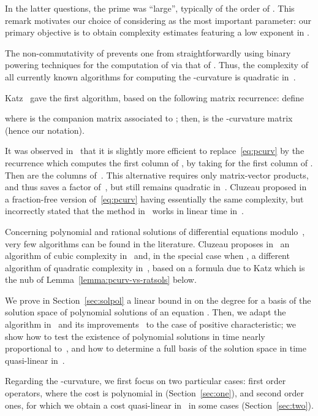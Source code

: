 \documentclass{sig-alternate}
\begin{document}
In the latter questions, the prime  was ``large'', typically of the
order of . This remark motivates our choice of considering 
as the most important parameter: our primary objective is to obtain
complexity estimates featuring a low exponent in .

\smallskip{}  The non-commutativity of
 prevents one from straightforwardly
using binary powering techniques for the computation of  via
that of . Thus, the complexity of all currently
known algorithms for computing the -curvature is quadratic in~.

Katz~\cite{Katz82} gave the first algorithm, based on the following
matrix recurrence: define

where  is the companion matrix
associated to ; then,  is the -curvature matrix (hence
our notation). 

It was observed in~\cite[\S13.2.2]{PuSi03} that it is slightly more
efficient to replace~\eqref{eq:pcurv} by the recurrence  which computes the first column  of
, by taking for  the first column of . Then
 are the columns of~. This
alternative requires only matrix-vector products, and thus saves a
factor of~, but still remains quadratic in~.  Cluzeau proposed
in~\cite[Prop.~3.2]{Cluzeau03} a fraction-free version
of~\eqref{eq:pcurv} having essentially the same complexity, but
incorrectly stated that the method in~\cite{PuSi03} works in linear
time in~.

Concerning polynomial and rational solutions of differential equations
modulo~, very few algorithms can be found in the literature. Cluzeau
proposes in~\cite[\S2]{Cluzeau03} an algorithm of cubic complexity
in~ and, in the special case when , a different algorithm
of quadratic complexity in~, based on a formula due to Katz which is
the nub of Lemma~\ref{lemma:pcurv-vs-ratsols} below.

\smallskip{}  We prove in
Section~\ref{sec:solpol} a linear bound in  on the degree for a
basis of the solution space of polynomial solutions of an equation
. Then, we adapt the algorithm in~\cite{AbBrPe95} and its
improvements~\cite{BoClSa05} to the case of positive characteristic;
we show how to test the existence of polynomial solutions in time
nearly proportional to~, and how to determine a full basis of the solution
space in time quasi-linear in~.

Regarding the -curvature, we first focus on two particular cases:
first order operators, where the cost is polynomial in 
(Section~\ref{sec:one}), and second order ones, for which we obtain a
cost quasi-linear in~ in some cases 
(Section~\ref{sec:two}).
\end{document}
